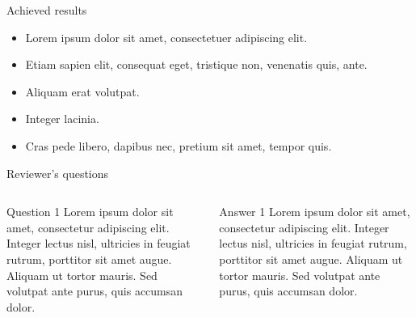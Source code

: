 \documentclass[aspectratio=1610]{beamer}
\begin{document}
\begin{frame}{Achieved results}
    \begin{itemize}
        \item Lorem ipsum dolor sit amet, consectetuer adipiscing elit.
        \item Etiam sapien elit, consequat eget, tristique non, venenatis quis, ante.
        \item Aliquam erat volutpat.
        \item Integer lacinia.
        \item Cras pede libero, dapibus nec, pretium sit amet, tempor quis.
    \end{itemize}
\end{frame}

\begin{frame}{Reviewer's questions}
    \begin{columns}
        \begin{exampleblock}{Question 1}
            Lorem ipsum dolor sit amet, consectetur adipiscing elit. Integer lectus nisl, ultricies in feugiat rutrum, porttitor sit amet augue. Aliquam ut tortor mauris. Sed volutpat ante purus, quis accumsan dolor.
        \end{exampleblock}

        \begin{block}{Answer 1}
            Lorem ipsum dolor sit amet, consectetur adipiscing elit. Integer lectus nisl, ultricies in feugiat rutrum, porttitor sit amet augue. Aliquam ut tortor mauris. Sed volutpat ante purus, quis accumsan dolor.
        \end{block}
    \end{columns}
\end{frame}

\end{document}

